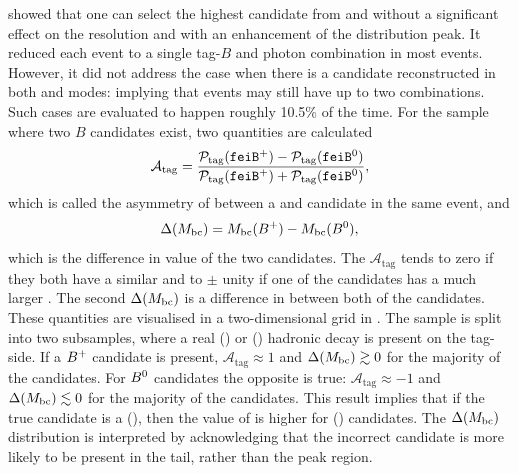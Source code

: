  showed that one can select the highest \feiProb candidate from \feiBp and \feiBz without a significant effect on the \EB resolution and with an enhancement of the \Mbc distribution peak.
It reduced each event to a single tag-$B$ and photon combination in most events.
However, it did not address the case when there is a candidate reconstructed in both \feiBp and \feiBz modes: implying that events may still have up to two combinations.
Such cases are evaluated to happen roughly 10.5\% of the time. 
For the sample where two $B$ candidates exist, two quantities are calculated
\begin{equation}\label{eq:asymmetry_tag}
    \mathcal{A}_{\mathrm{tag}} = \frac{\mathcal{P}_{\mathrm{tag}}({\texttt{feiB}^+}) - \mathcal{P}_{\mathrm{tag}}({\texttt{feiB}^0})}{\mathcal{P}_{\mathrm{tag}}({\texttt{feiB}^+}) + \mathcal{P}_{\mathrm{tag}}({\texttt{feiB}^0})},
\end{equation}
which is called the asymmetry of \feiProb between a \feiBp and \feiBz candidate in the same event, and
\begin{equation}\label{eq:delta_mbc}
    \Delta({M_{\mathrm{bc}}}) = {M_{\mathrm{bc}}}(B^+) - {M_{\mathrm{bc}}}(B^0),
\end{equation}
which is the difference in \Mbc value of the two candidates.
The $\mathcal{A}_{\mathrm{tag}}$ tends to zero if they both have a similar \feiProb and to $\pm$ unity if one of the candidates has a much larger \feiProb.
The second $\Delta({M_{\mathrm{bc}}})$ is a difference in \Mbc between both of the candidates.
These quantities are visualised in a two-dimensional grid in .
The sample is split into two subsamples, where a real \Bp () or \Bz () hadronic decay is present on the tag-side.
If a $B^+$ candidate is present, $\mathcal{A}_{\mathrm{tag}}\approx1$ and $\Delta({M_{\mathrm{bc}}})\gtrsim 0$ for the majority of the candidates.
For $B^0$ candidates the opposite is true: $\mathcal{A}_{\mathrm{tag}}\approx-1$ and $\Delta({M_{\mathrm{bc}}})\lesssim 0$ for the majority of the candidates.
This result implies that if the true candidate is a \Bp(\Bz), then the value of \feiProb is higher for \feiBp (\feiBz) candidates.
The $\Delta({M_{\mathrm{bc}}})$ distribution is interpreted by acknowledging that the incorrect candidate is more likely to be present in the \Mbc tail, rather than the peak region.

